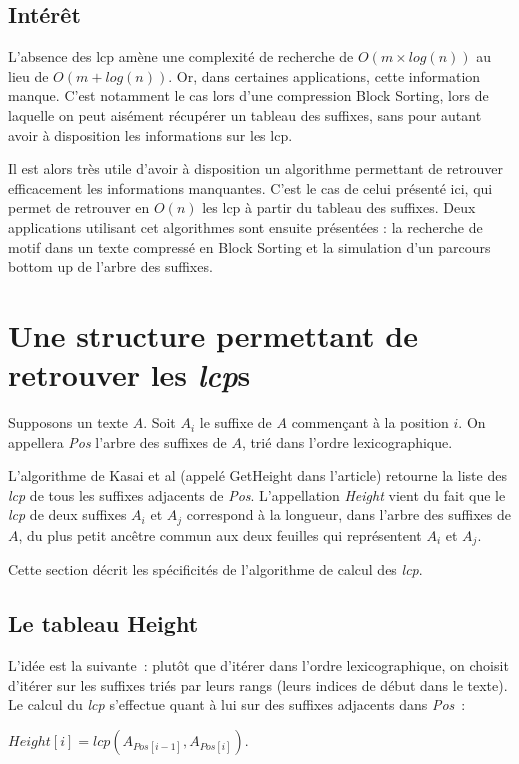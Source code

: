 \documentclass[a4paper,10pt]{article}
\begin{document}
\subsection{Intérêt}
\label{sec:interest}


L'absence des lcp amène une complexité de recherche de $O(m \times log(n))$
au lieu de $O(m+log(n))$. Or, dans certaines applications, cette
information manque. C'est notamment le cas lors d'une compression
Block Sorting, lors de laquelle on peut aisément récupérer un tableau
des suffixes, sans pour autant avoir à disposition les informations
sur les lcp.

Il est alors très utile d'avoir à disposition un algorithme permettant
de retrouver efficacement les informations manquantes. C'est le cas de
celui présenté ici, qui permet de retrouver en $O(n)$ les lcp à
partir du tableau des suffixes. Deux applications utilisant cet
algorithmes sont ensuite présentées : la recherche de motif dans un
texte compressé en Block Sorting et la simulation d'un parcours bottom
up de l'arbre des suffixes.


\section{Une structure permettant de retrouver les \textit{lcp}s}
\label{sec:heightstruct}

Supposons un texte $A$. Soit $A_{i}$ le suffixe de $A$ commençant à la
position $i$. On appellera \textit{Pos} l'arbre des suffixes de $A$,
trié dans l'ordre lexicographique.

L'algorithme de Kasai et al (appelé GetHeight dans l'article) retourne
la liste des \textit{lcp} de tous les suffixes adjacents de
\textit{Pos}. L'appellation \textit{Height} vient du fait que le
\textit{lcp} de deux suffixes $A_i$ et $A_j$ correspond à la longueur,
dans l'arbre des suffixes de $A$, du plus petit ancêtre commun aux
deux feuilles qui représentent $A_i$ et $A_j$.

Cette section décrit les spécificités de l'algorithme de calcul des
\textit{lcp}.


\subsection{Le tableau Height}
\label{sec:struct}


L'idée est la suivante~: plutôt que d'itérer dans l'ordre
lexicographique, on choisit d'itérer sur les suffixes triés par leurs
rangs (leurs indices de début dans le texte). Le calcul du
\textit{lcp} s'effectue quant à lui sur des suffixes adjacents dans
\textit{Pos}~:
\begin{center}$\mathit{Height}[i] = \mathit{lcp}(A_{\mathit{Pos}[i-1]}, A_{\mathit{Pos}[i]})$.\end{center}
\end{document}
